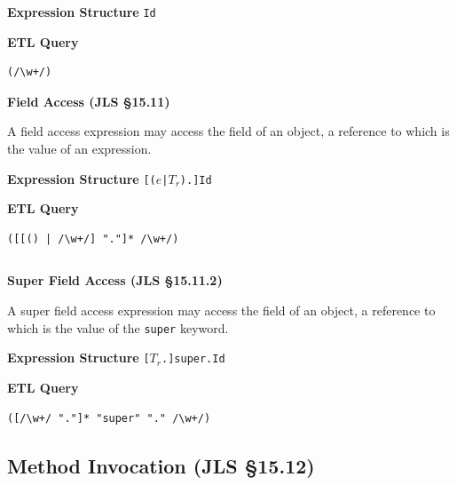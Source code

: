 \begin{chapterBody}
\begin{minipage}[t]{.45\linewidth}
\textbf{Expression Structure} \hfill\break
\texttt{Id}
\end{minipage}
\begin{minipage}[t]{.45\linewidth}
\textbf{ETL Query}
\begin{lstlisting}[language=etl]
(/\w+/)
\end{lstlisting}
\end{minipage}

\noindent\textbf{Field Access (JLS \S15.11)}

A field access expression may access the field of an object, a reference to
which is the value of an expression.
\vspace{1em}

\begin{minipage}[t]{.45\linewidth}
\textbf{Expression Structure} \hfill\break
\texttt{[($e$|$T_r$).]Id}
\end{minipage}
\begin{minipage}[t]{.45\linewidth}
\textbf{ETL Query}
\begin{lstlisting}[language=etl]
([[() | /\w+/] "."]* /\w+/)
\end{lstlisting}
\end{minipage}

\begin{lstlisting}[language=etl]
\end{lstlisting}

\noindent\textbf{Super Field Access (JLS \S15.11.2)}

A super field access expression may access the field of an object, a reference
to which is the value of the \texttt{super} keyword.
\vspace{1em}

\begin{minipage}[t]{.45\linewidth}
\textbf{Expression Structure} \hfill\break
\texttt{[$T_r$.]{\color{bp-blue}super}.Id}
\end{minipage}
\begin{minipage}[t]{.45\linewidth}
\textbf{ETL Query}
\begin{lstlisting}[language=etl]
([/\w+/ "."]* "super" "." /\w+/)
\end{lstlisting}
\end{minipage}

\subsection*{Method Invocation (JLS \S15.12)}


\end{chapterBody}
